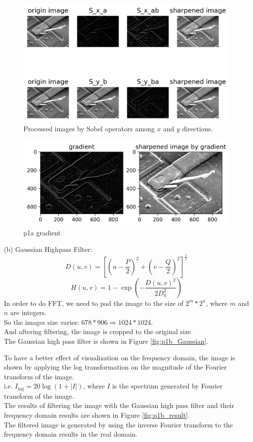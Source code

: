 \begin{figure}[htbp]
    \centering
	\includegraphics[width=\textwidth]{../images/p1/p1a.png}
    \caption{Processed images by Sobel operators among $x$ and $y$ directions.}
    \label{fig:p1a}
\end{figure}

\begin{figure}[htbp]
    \centering
	\includegraphics[width=\textwidth]{../images/p1/p1a_gradient.png}
    \caption{p1a gradient}
    \label{fig:p1a_gradient}
\end{figure}


(b)
Gaussian Highpass Filter:
$$D(u,v)=\left[\left(u-\dfrac{P}{2}\right)^2+\left(v-\dfrac{Q}{2}\right)^2\right]^\frac{1}{2}$$
$$H(u,v)=1-\exp\left(-\dfrac{D(u,v)^2}{2D_0^2}\right)$$
In order to do FFT, we need to pad the image to the size of $2^m*2^n$, where $m$ and $n$ are integers.\\
So the images size varies: $678*906\Rightarrow 1024*1024$.\\
And aftering filtering, the image is cropped to the original size.\\

The Gaussian high pass filter is shown in Figure \ref{fig:p1b_Gaussian}.

To have a better effect of visualization on the frequency domain, the image is shown by applying the log transformation on the magnitude of the Fourier transform of the image.\\
i.e. $I_{\text{log}}=20\log(1+|I|)$, where $I$ is the spectrum generated by Fourier transform of the image.\\
The results of filtering the image with the Gaussian high pass filter and their frequency domain results are shown in Figure \ref{fig:p1b_result}.\\
The filtered image is generated by using the inverse Fourier transform to the frequency domain results in the real domain.\\

